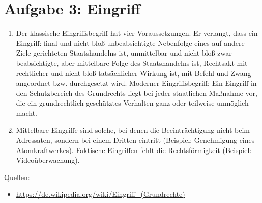 \documentclass{article}
\begin{document}
	\section*{Aufgabe 3: Eingriff}
	\begin{enumerate}[label=(\alph*)]
		\item Der klassische Eingriffsbegriff hat vier Voraussetzungen. Er verlangt, dass ein Eingriff: final und nicht bloß unbeabsichtigte Nebenfolge eines auf andere Ziele gerichteten Staatshandelns ist, unmittelbar und nicht bloß zwar beabsichtigte, aber mittelbare Folge des Staatshandelns ist, Rechtsakt mit rechtlicher und nicht bloß tatsächlicher Wirkung ist, mit Befehl und Zwang angeordnet bzw. durchgesetzt wird. Moderner Eingriffsbegriff: Ein Eingriff in den Schutzbereich des Grundrechts liegt bei jeder staatlichen Maßnahme vor, die ein grundrechtlich geschütztes Verhalten ganz oder teilweise unmöglich macht.
		\item Mittelbare Eingriffe sind solche, bei denen die Beeinträchtigung nicht beim Adressaten, sondern bei einem Dritten eintritt (Beispiel: Genehmigung eines Atomkraftwerkes). Faktische Eingriffen fehlt die Rechtsförmigkeit (Beispiel: Videoüberwachung).
	\end{enumerate}

	Quellen:
	\begin{itemize}
		\item \url{https://de.wikipedia.org/wiki/Eingriff_(Grundrechte)}
	\end{itemize}
\end{document}
